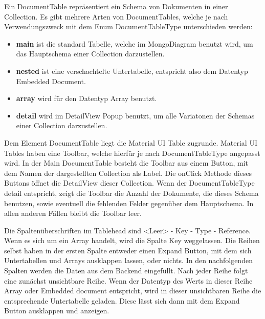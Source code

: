 Ein DocumentTable repräsentiert ein Schema von Dokumenten in einer Collection.
Es gibt mehrere Arten von DocumentTables, welche je nach Verwendungszweck mit dem Enum DocumentTableType unterschieden werden:
\begin{itemize}
    \item \textbf{main} ist die standard Tabelle, welche im MongoDiagram benutzt wird, um das Hauptschema einer Collection darzustellen.
    \item \textbf{nested} ist eine verschachtelte Untertabelle, entspricht also dem Datentyp Embedded Document.
    \item \textbf{array} wird für den Datentyp Array benutzt.
    \item \textbf{detail} wird im DetailView Popup benutzt, um alle Variatonen der Schemas einer Collection darzustellen.
\end{itemize}

Dem Element DocumentTable liegt die Material UI Table zugrunde.
Material UI Tables haben eine Toolbar, welche hierfür je nach DocumentTableType angepasst wird.
In der Main DocumentTable besteht die Toolbar aus einem Button, mit dem Namen der dargestellten Collection als Label.
Die onClick Methode dieses Buttons öffnet die DetailView dieser Collection.
Wenn der DocumentTableType detail entspricht, zeigt die Toolbar die Anzahl der Dokumente, die dieses Schema benutzen, sowie eventuell die fehlenden Felder gegenüber dem Hauptschema.
In allen anderen Fällen bleibt die Toolbar leer.

Die Spaltenüberschriften im Tablehead sind <Leer> - Key - Type - Reference.
Wenn es sich um ein Array handelt, wird die Spalte Key weggelassen.
Die Reihen selbst haben in der ersten Spalte entweder einen Expand Button, mit dem sich Untertabellen und Arrays ausklappen lassen, oder nichts.
In den nachfolgenden Spalten werden die Daten aus dem Backend eingefüllt.
Nach jeder Reihe folgt eine zunächst unsichtbare Reihe.
Wenn der Datentyp des Werts in dieser Reihe Array oder Embedded document entspricht, wird in dieser unsichtbaren Reihe die entsprechende Untertabelle geladen.
Diese lässt sich dann mit dem Expand Button ausklappen und anzeigen.

